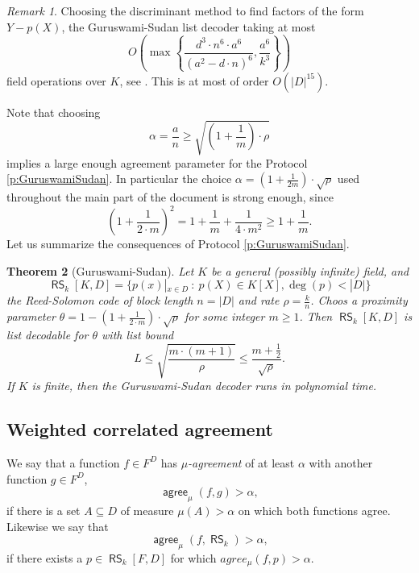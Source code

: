 \documentclass[11pt]{article}
\newtheorem{thm}{Theorem}[]
\theoremstyle{definition}
\theoremstyle{remark}
\newtheorem{rem}[thm]{Remark}
\DeclareMathOperator{\RS}{\mathsf{RS}}
\DeclareMathOperator{\agree}{\mathsf{agree}}
\begin{document}
\begin{rem}
\label{rem:GuruswamiSudanTime}
Choosing the discriminant method to find factors of the form $Y- p(X)$, the Guruswami-Sudan list decoder taking at most
\[
O\left(\max\left\{\frac{d^3 \cdot n^6 \cdot a^6}{(a^2 - d\cdot n)^6}, \frac{a^6}{k^3}\right\}\right)
\]
field operations over $K$, see \cite{GuruswamiSudan}.
This is at most of order $O\left(|D|^{15}\right)$.
\end{rem}

Note that choosing 
\[
\alpha = \frac{a}{n}\geq \sqrt{\left(1+\frac{1}{m}\right)\cdot \rho}
\] 
implies a large enough agreement parameter for the Protocol \ref{p:GuruswamiSudan}.
In particular the choice $\alpha =\left(1+\frac{1}{2m}\right)\cdot\sqrt\rho$ used throughout the main part of the document is strong enough, since
\[
\left(1+\frac{1}{2\cdot m}\right)^2 = 1 + \frac{1}{m} +\frac{1}{4\cdot m^2} \geq 1+ \frac{1}{m}.
\]
Let us summarize the consequences of Protocol \ref{p:GuruswamiSudan}.

\begin{thm}[Guruswami-Sudan] 
Let $K$ be a general (possibly infinite) field, and
\[
\RS_k[K,D]= \big\{ p(x)|_{x\in D}\: : \: p(X)\in K[X], \deg(p) < |D| \big\}
\] 
the Reed-Solomon code of block length $n=|D|$ and rate $\rho=\frac{k}{n}$. 
Choos a proximity parameter $\theta =1- \left(1+\frac{1}{2\cdot m}\right)\cdot \sqrt{\rho}$ for some integer $m\geq 1$. 
Then $\RS_k[K,D]$ is list decodable for $\theta$ with list bound
\begin{equation}
\label{e:GuruswamiSudanListBound}
L \leq \sqrt{\frac{m\cdot (m+1)}{\rho}} \leq \frac{m+\frac{1}{2}}{\sqrt\rho}.
\end{equation}
If $K$ is finite, then the Guruswami-Sudan decoder runs in polynomial time.
\end{thm}


\subsection{Weighted correlated agreement}
\label{s:WeigthedCorrelatedAgreement}


We say that a function $f\in F^D$ has \textit{$\mu$-agreement} of at least $\alpha$ with another function $g\in F^D$,
\[ 
\agree_\mu(f, g)>\alpha,
\]
if there is a set $A\subseteq D$ of measure $\mu(A)>\alpha$ on which both functions agree. 
Likewise we say that 
\[
\agree_\mu(f, \RS_k) > \alpha,
\] 
if there exists a $p \in \RS_k[F,D]$ for which $agree_\mu(f,p)>\alpha$.
\end{document}
